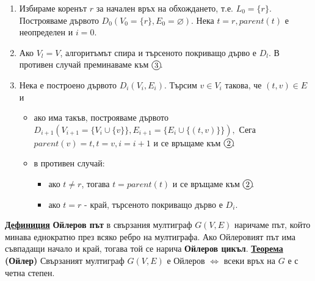 \documentclass{article}
\begin{document}
\begin{enumerate}[label=\protect\circled{\arabic*}]
    \item Избираме коренът $r$ за начален връх на обхождането, т.е. $L_0 = \{r\}$. Построяваме дървото $D_0(V_0= \{r\}, E_0 = \varnothing)$. \newline
    Нека $t = r, parent(t)$ е неопределен и $i = 0$.
    \item Ако $V_l = V$, алгоритъмът спира и търсеното покриващо дърво е $D_l$. В противен случай преминаваме към $\circled{3}$.
    \item Нека е построено дървото $D_i(V_i, E_i)$. Търсим $v \in V_i$ такова, че $(t, v) \in E$ и
    \begin{itemize}
        \item ако има такъв, построяваме дървото $D_{i+1}(V_{i+1} = \{V_i \cup \{v\}\}, E_{i+1} = \{E_i \cup \{(t, v)\}\}),$
        Сега $parent(v) = t, t = v, i = i + 1$ и се връщаме към $\circled{2}$.
        \item в противен случай:
        \begin{itemize}
            \item ако $t \neq r$, тогава $t = parent(t)$ и се връщаме към $\circled{2}$.
            \item ако $t = r$ - край, търсеното покриващо дърво е $D_i$.
        \end{itemize}
    \end{itemize}
\end{enumerate}
\textbf{\underline{Дефиниция}}
\textbf{Ойлеров път} в свързания мултиграф $G(V, E)$ наричаме път, който минава еднократно през всяко ребро на мултиграфа.
Ако Ойлеровият път има съвпадащи начало и край, тогава той се нарича \textbf{Ойлеров цикъл}. \newline\newline
\textbf{\underline{Теорема} (Ойлер)} \newline
Свързаният мултиграф $G(V, E)$ е Ойлеров $\iff$ всеки връх на $G$ е с четна степен.
\end{document}
